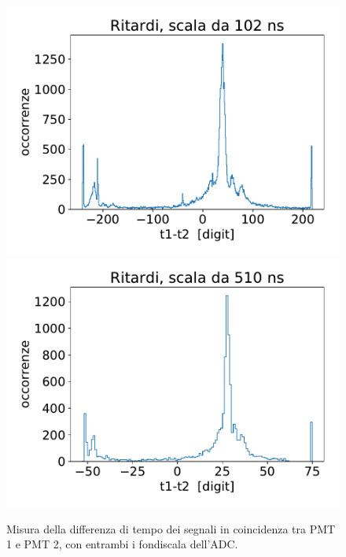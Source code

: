 \begin{figure}[h]
\centering
\subfloat
{\includegraphics[width=18 em]{immagini/100}
}
\subfloat
{\includegraphics[width=18 em]{immagini/500}
}

\caption{Misura della differenza di tempo dei segnali in coincidenza tra PMT 1 e PMT 2,
con entrambi i fondiscala dell'ADC.}
\label{confronto}
\end{figure}
